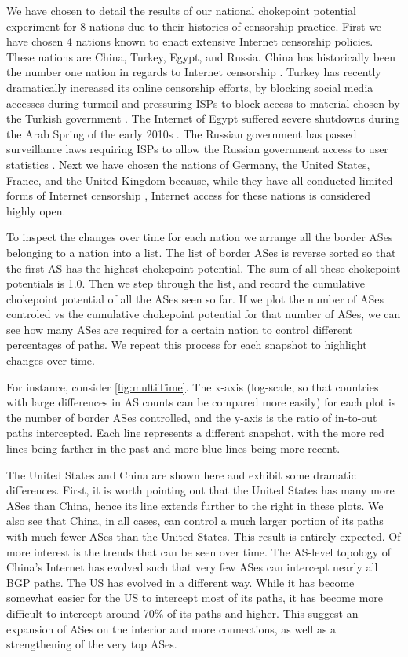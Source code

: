 We have chosen to detail the results of our national chokepoint potential
experiment for 8 nations due to
their histories of censorship practice. First we have chosen 4 nations known to
enact extensive Internet censorship policies. These nations are China, Turkey,
Egypt, and Russia. China has historically been the number one nation in regards
to Internet censorship \cite{censorshipSurvey}. Turkey has recently
dramatically increased its online censorship efforts, by blocking social media
accesses during turmoil and pressuring ISPs to block access to material chosen
by the Turkish government \cite{turkeyCensor}. The Internet of Egypt suffered
severe shutdowns during the Arab Spring of the early 2010s \cite{arabspring}.
The Russian government has passed surveillance laws requiring ISPs to allow the
Russian government access to user statistics \cite{censorshipGeography}. Next
we have chosen the nations of Germany, the United States, France, and the
United Kingdom because, while they have all conducted limited forms of Internet
censorship \cite{censorshipSurvey}, Internet access for these nations is
considered highly open.

To inspect the changes over time for each nation we arrange all the border ASes
belonging to a nation into a list. The list of border ASes is reverse sorted so
that the first AS has the highest chokepoint potential. The sum of all these
chokepoint potentials is 1.0. Then we step through the list, and record the
cumulative chokepoint potential of all the ASes seen so far. If we plot the
number of ASes controled vs the cumulative chokepoint potential for that number
of ASes, we can see how many ASes are required for a certain nation to control
different percentages of paths. We repeat this process for each snapshot to
highlight changes over time.

For instance, consider \figurename \ref{fig:multiTime}.  The x-axis (log-scale,
so that countries with large differences in AS counts can be compared more
easily) for each plot is the number of border ASes controlled, and the y-axis
is the ratio of in-to-out paths intercepted. Each line represents a different
snapshot, with the more red lines being farther in the past and more blue lines
being more recent.

The United States and China are shown here and exhibit some dramatic
differences. First, it is worth pointing out that the United States has many
more ASes than China, hence its line extends further to the right in these
plots. We also see that China, in all cases, can control a much larger portion
of its paths with much fewer ASes than the United States. This result is
entirely expected. Of more interest is the trends that can be seen over time.
The AS-level topology of China's Internet has evolved such that very few ASes
can intercept nearly all BGP paths. The US has evolved in a different way.
While it has become somewhat easier for the US to intercept most of its paths,
it has become more difficult to intercept around 70\% of its paths and higher.
This suggest an expansion of ASes on the interior and more connections, as well
as a strengthening of the very top ASes.


